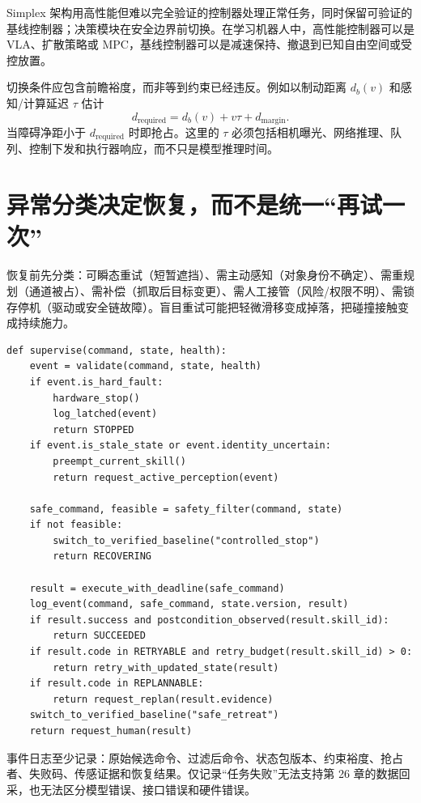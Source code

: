 Simplex 架构用高性能但难以完全验证的控制器处理正常任务，同时保留可验证的基线控制器；决策模块在安全边界前切换\cite{sha2001simplex}。在学习机器人中，高性能控制器可以是 VLA、扩散策略或 MPC，基线控制器可以是减速保持、撤退到已知自由空间或受控放置。

切换条件应包含前瞻裕度，而非等到约束已经违反。例如以制动距离 $d_b(v)$ 和感知/计算延迟 $\tau$ 估计
\begin{equation}
d_{\mathrm{required}}=d_b(v)+v\tau+d_{\mathrm{margin}}.
\end{equation}
当障碍净距小于 $d_{\mathrm{required}}$ 时即抢占。这里的 $\tau$ 必须包括相机曝光、网络推理、队列、控制下发和执行器响应，而不只是模型推理时间。

\section{异常分类决定恢复，而不是统一“再试一次”}

恢复前先分类：可瞬态重试（短暂遮挡）、需主动感知（对象身份不确定）、需重规划（通道被占）、需补偿（抓取后目标变更）、需人工接管（风险/权限不明）、需锁存停机（驱动或安全链故障）。盲目重试可能把轻微滑移变成掉落，把碰撞接触变成持续施力。

\begin{lstlisting}[caption={运行时监督器教学伪代码：抢占、降级与恢复}]
def supervise(command, state, health):
    event = validate(command, state, health)
    if event.is_hard_fault:
        hardware_stop()
        log_latched(event)
        return STOPPED
    if event.is_stale_state or event.identity_uncertain:
        preempt_current_skill()
        return request_active_perception(event)

    safe_command, feasible = safety_filter(command, state)
    if not feasible:
        switch_to_verified_baseline("controlled_stop")
        return RECOVERING

    result = execute_with_deadline(safe_command)
    log_event(command, safe_command, state.version, result)
    if result.success and postcondition_observed(result.skill_id):
        return SUCCEEDED
    if result.code in RETRYABLE and retry_budget(result.skill_id) > 0:
        return retry_with_updated_state(result)
    if result.code in REPLANNABLE:
        return request_replan(result.evidence)
    switch_to_verified_baseline("safe_retreat")
    return request_human(result)
\end{lstlisting}

事件日志至少记录：原始候选命令、过滤后命令、状态包版本、约束裕度、抢占者、失败码、传感证据和恢复结果。仅记录“任务失败”无法支持第 26 章的数据回采，也无法区分模型错误、接口错误和硬件错误。

